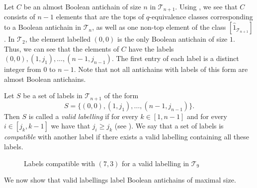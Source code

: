 \documentclass{preprint}
\newcommand{\cT}{\mathcal{T}}
\theoremstyle{definition}
\begin{document}
Let $C$ be an almost Boolean antichain of size $n$ in $\cT_{n+1}$. Using , we see that $C$ consists of $n-1$ elements that are the tops of $q$-equivalence classes corresponding to a Boolean antichain in $\cT_n$, as well as one non-top element of the class $[\hat{1}_{\cT_{n+1}}]$.
In $\cT_2$, the element labelled $(0,0)$ is the only Boolean antichain of size $1$. Thus, we can see that the elements of $C$ have the labels $(0,0),(1,j_1),\dots,(n-1,j_{n-1})$. The first entry of each label is a distinct integer from $0$ to $n-1$. Note that not all antichains with labels of this form are almost Boolean antichains.

\begin{definition}
Let $S$ be a set of labels in $\cT_{n+1}$ of the form \[S = \{(0,0),(1,j_1),\ldots,(n-1,j_{n-1})\}.\]  
Then $S$ is called a \textit{valid labelling} if for every $k \in [1, n-1]$ and for every $i \in [j_k, k-1]$ we have that $j_i \geq j_k$ (see ). We say that a set of labels is \textit{compatible} with another label if there exists a valid labelling containing all these labels.
\end{definition}

\begin{figure}
    \centering
    \caption{Labels compatible with $(7, 3)$ for a valid labelling in $\cT_9$}
    \label{fig:triangleValidLabelling}
\end{figure}

We now show that valid labellings label Boolean antichains of maximal size.
\end{document}
